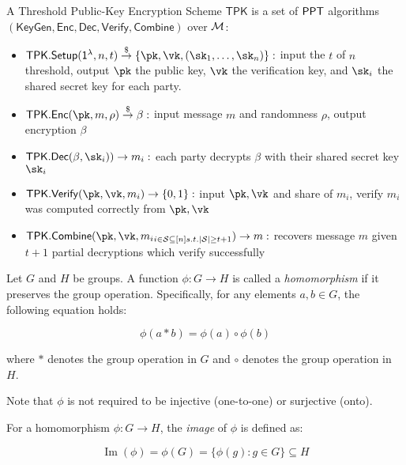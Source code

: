 \begin{definition}
A Threshold Public-Key Encryption Scheme $\mathsf{TPK}$ is a set of $\mathsf{PPT}$ algorithms $\mathsf{(KeyGen, Enc, Dec, Verify, Combine)}$ over $\mathcal{M}$: 
    \begin{itemize}
        \item $\mathsf{TPK.Setup}(\secparam, n, t) \torand \{\pk, \vk, (\sk_1, \dots, \sk_n)\}:$ input the $t$ of $n$ threshold, output $\pk$ the public key, $\vk$ the verification key, and $\sk_i$ the shared secret key for each party.
        \item $\mathsf{TPK.Enc}(\pk, m, \rho) \torand \beta:$ input message $m$ and randomness $\rho$, output encryption $\beta$
        \item $\mathsf{TPK.Dec}(\beta, \sk_i)) \to m_i:$ each party decrypts $\beta$ with their shared secret key $\sk_i$
        \item $\mathsf{TPK.Verify}(\pk, \vk , m_i) \to  \bit:$ input $\pk, \vk$ and share of $m_i$, verify $m_i$ was computed correctly from $\pk, \vk$
        \item $\mathsf{TPK.Combine}(\pk, \vk, {m_i}_{i \in \setspace \subseteq [n] s.t. |\setspace| \geq t + 1}) \to m:$ recovers message $m$ given $t + 1$ partial decryptions which verify successfully
    \end{itemize}
\end{definition}


\begin{definition}[Homomorphism]
    Let $G$ and $H$ be groups. A function $\phi: G \to H$ is called a \textit{homomorphism} if it preserves the group operation. Specifically, for any elements $a, b \in G$, the following equation holds:
    
    \[\phi(a \ast b) = \phi(a) \circ \phi(b)\]
    
    where $\ast$ denotes the group operation in $G$ and $\circ$ denotes the group operation in $H$.
    \end{definition}
    
    \begin{remark}
    Note that $\phi$ is not required to be injective (one-to-one) or surjective (onto).
    \end{remark}
    
    \begin{definition}
    For a homomorphism $\phi: G \to H$, the \textit{image} of $\phi$ is defined as:
    
    \[\operatorname{Im}(\phi) = \phi(G) = \{\phi(g) : g \in G\} \subseteq H\]
    \end{definition}

